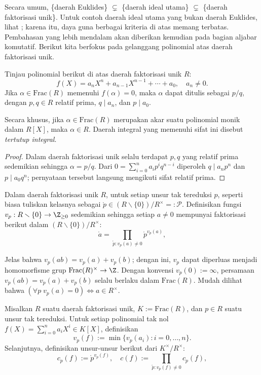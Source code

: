 Secara umum, \{daerah Euklides\} $\subsetneq$ \{daerah ideal utama\} $\subsetneq$ \{daerah faktorisasi unik\}. Untuk contoh daerah ideal utama yang bukan daerah Euklides, lihat \cite{Wil73}; karena itu, daya guna berbagai kriteria di atas memang terbatas. Pembahasan yang lebih mendalam akan diberikan kemudian pada bagian aljabar komutatif. Berikut kita berfokus pada gelanggang polinomial atas daerah faktorisasi unik.

\begin{proposition}
	Tinjau polinomial berikut di atas daerah faktorisasi unik $R$:
	\[ f(X) = a_n X^n + a_{n-1}X^{n-1} + \cdots + a_0, \quad a_n \neq 0. \]
	Jika $\alpha  \in \text{Frac}(R)$ memenuhi $f(\alpha)=0$, maka $\alpha$ dapat ditulis sebagai $p/q$, dengan $p,q \in R$ relatif prima, $q \mid a_n$, dan $p \mid a_0$.
\end{proposition}
Secara khusus, jika $\alpha \in \text{Frac}(R)$ merupakan akar suatu polinomial monik dalam $R[X]$, maka $\alpha \in R$. Daerah integral yang memenuhi sifat ini disebut \emph{tertutup integral}. 
\begin{proof}
	Dalam daerah faktorisasi unik selalu terdapat $p,q$ yang relatif prima sedemikian sehingga $\alpha = p/q$. Dari $0 = \sum_{i=0}^n a_i p^i q^{n-i}$ diperoleh $q  \mid  a_n p^n$ dan $p  \mid  a_0 q^n$; pernyataan tersebut langsung mengikuti sifat relatif prima.
\end{proof}

Dalam daerah faktorisasi unik $R$, untuk setiap unsur tak tereduksi $p$, seperti biasa tuliskan kelasnya sebagai $\mathring{p} \in (R \smallsetminus \{0\})/R^\times =: \mathcal{P}$. Definisikan fungsi $v_p: R \smallsetminus \{0\} \to \Z_{\geq 0}$ sedemikian sehingga setiap $a \neq 0$ mempunyai faktorisasi berikut dalam $(R \smallsetminus \{0\})/R^\times$:
\[ \mathring{a} = \prod_{\mathring{p}: v_p(a) \neq 0} \mathring{p}^{v_p(a)}, \]

Jelas bahwa $v_p(ab) = v_p(a) + v_p(b)$; dengan ini, $v_p$ dapat diperluas menjadi homomorfisme grup $\text{Frac}(R)^\times \to \Z$. Dengan konvensi $v_p(0) := \infty$, persamaan $v_p(ab) = v_p(a)+v_p(b)$ selalu berlaku dalam $\text{Frac}(R)$. Mudah dilihat bahwa $(\forall p \; v_p(a) = 0) \iff a \in R^\times$.

\begin{definition} %
	Misalkan $R$ suatu daerah faktorisasi unik, $K := \mathrm{Frac}(R)$, dan $p \in R$ suatu unsur tak tereduksi. Untuk setiap polinomial tak nol $f(X) = \sum_{i=0}^n a_i X^i \in K[X]$, definisikan
	\[ v_p(f) :=  \min\{ v_p(a_i) : i = 0, \ldots, n\}. \]
	Selanjutnya, definisikan unsur-unsur berikut dari $K^\times/R^\times$:
	\[ c_p(f) := \mathring{p}^{v_p(f)}, \quad c(f) := \prod_{\mathring{p}: v_p(f) \neq 0} c_p(f), \]
\end{definition}

